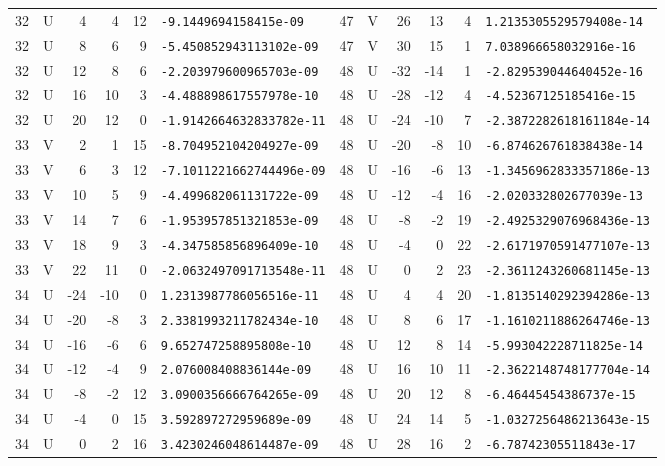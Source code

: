 \begin{longtable}{rcrrrl|rcrrrl}
32 & U & 4 & 4 & 12 & \texttt{-9.1449694158415e-09} & 47 & V & 26 & 13 & 4 & \texttt{1.2135305529579408e-14}\\
32 & U & 8 & 6 & 9 & \texttt{-5.450852943113102e-09} & 47 & V & 30 & 15 & 1 & \texttt{7.038966658032916e-16}\\
32 & U & 12 & 8 & 6 & \texttt{-2.203979600965703e-09} & 48 & U & -32 & -14 & 1 & \texttt{-2.829539044640452e-16}\\
32 & U & 16 & 10 & 3 & \texttt{-4.488898617557978e-10} & 48 & U & -28 & -12 & 4 & \texttt{-4.52367125185416e-15}\\
32 & U & 20 & 12 & 0 & \texttt{-1.9142664632833782e-11} & 48 & U & -24 & -10 & 7 & \texttt{-2.3872282618161184e-14}\\
33 & V & 2 & 1 & 15 & \texttt{-8.704952104204927e-09} & 48 & U & -20 & -8 & 10 & \texttt{-6.874626761838438e-14}\\
33 & V & 6 & 3 & 12 & \texttt{-7.1011221662744496e-09} & 48 & U & -16 & -6 & 13 & \texttt{-1.3456962833357186e-13}\\
33 & V & 10 & 5 & 9 & \texttt{-4.499682061131722e-09} & 48 & U & -12 & -4 & 16 & \texttt{-2.020332802677039e-13}\\
33 & V & 14 & 7 & 6 & \texttt{-1.953957851321853e-09} & 48 & U & -8 & -2 & 19 & \texttt{-2.4925329076968436e-13}\\
33 & V & 18 & 9 & 3 & \texttt{-4.347585856896409e-10} & 48 & U & -4 & 0 & 22 & \texttt{-2.6171970591477107e-13}\\
33 & V & 22 & 11 & 0 & \texttt{-2.0632497091713548e-11} & 48 & U & 0 & 2 & 23 & \texttt{-2.3611243260681145e-13}\\
34 & U & -24 & -10 & 0 & \texttt{1.2313987786056516e-11} & 48 & U & 4 & 4 & 20 & \texttt{-1.8135140292394286e-13}\\
34 & U & -20 & -8 & 3 & \texttt{2.3381993211782434e-10} & 48 & U & 8 & 6 & 17 & \texttt{-1.1610211886264746e-13}\\
34 & U & -16 & -6 & 6 & \texttt{9.652747258895808e-10} & 48 & U & 12 & 8 & 14 & \texttt{-5.993042228711825e-14}\\
34 & U & -12 & -4 & 9 & \texttt{2.076008408836144e-09} & 48 & U & 16 & 10 & 11 & \texttt{-2.3622148748177704e-14}\\
34 & U & -8 & -2 & 12 & \texttt{3.0900356666764265e-09} & 48 & U & 20 & 12 & 8 & \texttt{-6.46445454386737e-15}\\
34 & U & -4 & 0 & 15 & \texttt{3.592897272959689e-09} & 48 & U & 24 & 14 & 5 & \texttt{-1.0327256486213643e-15}\\
34 & U & 0 & 2 & 16 & \texttt{3.4230246048614487e-09} & 48 & U & 28 & 16 & 2 & \texttt{-6.78742305511843e-17}\\
\end{longtable}
